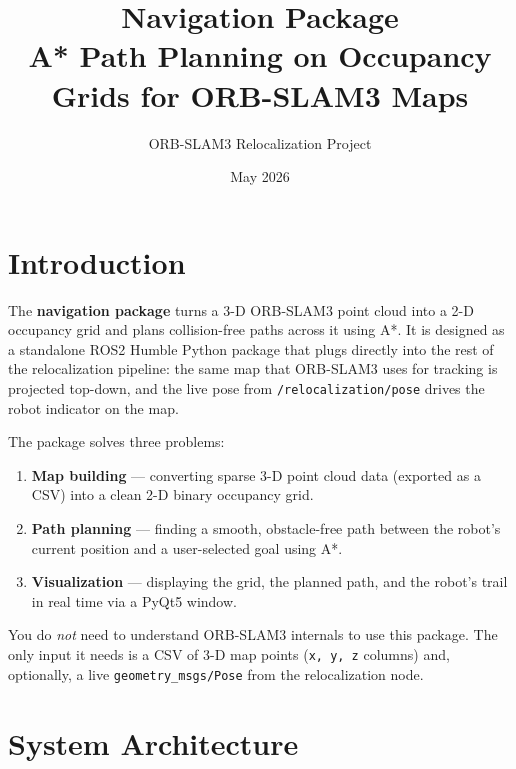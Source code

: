 \documentclass[12pt,a4paper]{article}
\title{\textbf{Navigation Package} \\[6pt]
  \large A* Path Planning on Occupancy Grids for ORB-SLAM3 Maps}
\author{ORB-SLAM3 Relocalization Project}
\date{May 2026}
\begin{document}
\maketitle
\tableofcontents
\newpage

\section{Introduction}

The \textbf{navigation package} turns a 3-D ORB-SLAM3 point cloud into a 2-D
occupancy grid and plans collision-free paths across it using A*.
It is designed as a standalone ROS2 Humble Python package that plugs directly
into the rest of the relocalization pipeline: the same map that ORB-SLAM3 uses
for tracking is projected top-down, and the live pose from
\texttt{/relocalization/pose} drives the robot indicator on the map.

The package solves three problems:

\begin{enumerate}[label=\arabic*.]
  \item \textbf{Map building} --- converting sparse 3-D point cloud data
        (exported as a CSV) into a clean 2-D binary occupancy grid.
  \item \textbf{Path planning} --- finding a smooth, obstacle-free path between
        the robot's current position and a user-selected goal using A*.
  \item \textbf{Visualization} --- displaying the grid, the planned path,
        and the robot's trail in real time via a PyQt5 window.
\end{enumerate}

\begin{tcolorbox}[notebox]
  You do \emph{not} need to understand ORB-SLAM3 internals to use this
  package. The only input it needs is a CSV of 3-D map points
  (\texttt{x, y, z} columns) and, optionally, a live
  \texttt{geometry\_msgs/Pose} from the relocalization node.
\end{tcolorbox}

\section{System Architecture}
\end{document}
